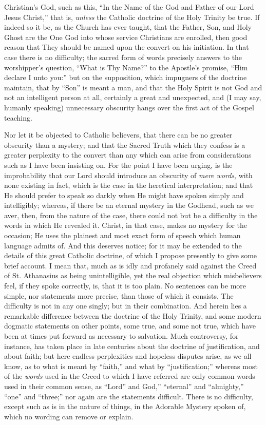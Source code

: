 Christian's God, such as this, ``In the Name of the God and Father
of our Lord Jesus Christ,'' that is, \emph{unless} the Catholic
doctrine of the Holy Trinity be true. If indeed so it be, as the
Church has ever taught, that the Father, Son, and Holy Ghost are the
One God into whose service Christians are enrolled, then good reason
that They should be named upon the convert on his initiation. In that
case there is no difficulty; the sacred form of words precisely
answers to the worshipper's question, ``What is Thy Name?'' to
the Apostle's promise, ``Him declare I unto you:'' but on the
supposition, which impugners of the doctrine maintain, that by
``Son'' is meant a man, and that the Holy Spirit is not God
and not an intelligent person at all, certainly a great and
unexpected, and (I may say, humanly speaking) unnecessary obscurity
hangs over the first act of the Gospel teaching.

Nor let it be objected to Catholic believers, that there can be no
greater obscurity than a mystery; and that the Sacred Truth which they
confess is a greater perplexity to the convert than any which can
arise from considerations such as I have been insisting on. For the
point I have been urging, is the improbability that our Lord should
introduce an obscurity of \emph{mere words}, with none existing in
fact, which is the case in the heretical interpretation; and that He
should prefer to speak so darkly when He might have spoken simply and
intelligibly; whereas, if there be an eternal mystery in the Godhead,
such as we aver, then, from the nature of the case, there could not
but be a difficulty in the words in which He revealed it. Christ, in
that case, makes no mystery for the occasion; He uses the plainest and
most exact form of speech which human language admits of. And this
deserves notice; for it may be extended to the details of this great
Catholic doctrine, of which I propose presently to give some brief
account. I mean that, much as is idly and profanely said against the
Creed of St. Athanasius as being unintelligible, yet the real
objection which misbelievers feel, if they spoke correctly, is, that
it is too plain. No sentences can be more simple, nor statements more
precise, than those of which it consists. The difficulty is not in any
one singly; but in their combination. And herein lies a remarkable
difference between the doctrine of the Holy Trinity, and some modern
dogmatic statements on other points, some true, and some not true,
which have been at times put forward as necessary to salvation. Much
controversy, for instance, has taken place in late centuries about the
doctrine of justification, and about faith; but here endless
perplexities and hopeless disputes arise, as we all know, as to what
is meant by ``faith,'' and what by ``justification;''
whereas most of the \emph{words} used in the Creed to which I have
referred are only common words used in their common sense, as
``Lord'' and God,'' ``eternal'' and
``almighty,'' ``one'' and ``three;'' nor again
are the statements difficult. There is no difficulty, except such as
is in the nature of things, in the Adorable Mystery spoken of, which
no wording can remove or explain.

